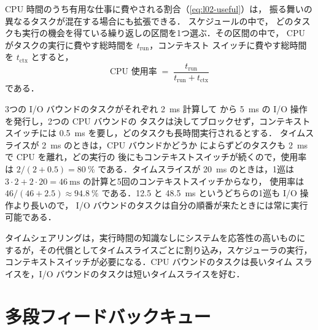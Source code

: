 \documentclass[../main.tex]{subfiles}
\begin{document}
CPU 時間のうち有用な仕事に費やされる割合（\cref{eq:l02-useful}）は，
振る舞いの異なるタスクが混在する場合にも拡張できる．%
スケジュールの中で，
どのタスクも実行の機会を得ている繰り返しの区間を1つ選ぶ．その区間の中で，
CPU がタスクの実行に費やす総時間を $t_{\mathrm{run}}$，コンテキスト
スイッチに費やす総時間を $t_{\mathrm{ctx}}$ とすると，
\begin{equation}
  \text{CPU 使用率} \;=\;
  \frac{t_{\mathrm{run}}}{t_{\mathrm{run}} + t_{\mathrm{ctx}}}
  \label{eq:l07-utilization}
\end{equation}
である．

\begin{example}
  3つの I/O バウンドのタスクがそれぞれ \SI{2}{\milli\second} 計算して
  から \SI{5}{\milli\second} の I/O 操作を発行し，2つの CPU バウンドの
  タスクは決してブロックせず，コンテキストスイッチには
  \SI{0.5}{\milli\second} を要し，どのタスクも長時間実行されるとする．
  タイムスライスが \SI{2}{\milli\second} のときは，CPU バウンドかどうか
  によらずどのタスクも \SI{2}{\milli\second} で CPU を離れ，どの実行の
  後にもコンテキストスイッチが続くので，使用率は
  $2/(2+0.5) = \SI{80}{\percent}$ である．タイムスライスが
  \SI{20}{\milli\second} のときは，1巡は $3\cdot 2 + 2\cdot 20 =
  \SI{46}{\milli\second}$ の計算と5回のコンテキストスイッチからなり，
  使用率は $46/(46+2.5) \approx \SI{94.8}{\percent}$ である．12.5 と
  \SI{48.5}{\milli\second} というどちらの1巡も I/O 操作より長いので，
  I/O バウンドのタスクは自分の順番が来たときには常に実行可能である．%
\end{example}

\begin{keypoint}
  タイムシェアリングは，実行時間の知識なしにシステムを応答性の高いものに
  するが，その代償としてタイムスライスごとに割り込み，スケジューラの実行，
  コンテキストスイッチが必要になる．CPU バウンドのタスクは長いタイム
  スライスを，I/O バウンドのタスクは短いタイムスライスを好む．
\end{keypoint}

\section{多段フィードバックキュー}
\label{sec:l07-mlfq}
\end{document}
